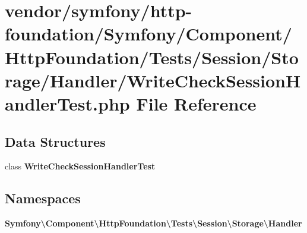 \section{vendor/symfony/http-\/foundation/\+Symfony/\+Component/\+Http\+Foundation/\+Tests/\+Session/\+Storage/\+Handler/\+Write\+Check\+Session\+Handler\+Test.php File Reference}
\label{_write_check_session_handler_test_8php}
\subsection*{Data Structures}
\begin{DoxyCompactItemize}
\item 
class {\bf Write\+Check\+Session\+Handler\+Test}
\end{DoxyCompactItemize}
\subsection*{Namespaces}
\begin{DoxyCompactItemize}
\item 
 {\bf Symfony\textbackslash{}\+Component\textbackslash{}\+Http\+Foundation\textbackslash{}\+Tests\textbackslash{}\+Session\textbackslash{}\+Storage\textbackslash{}\+Handler}
\end{DoxyCompactItemize}
